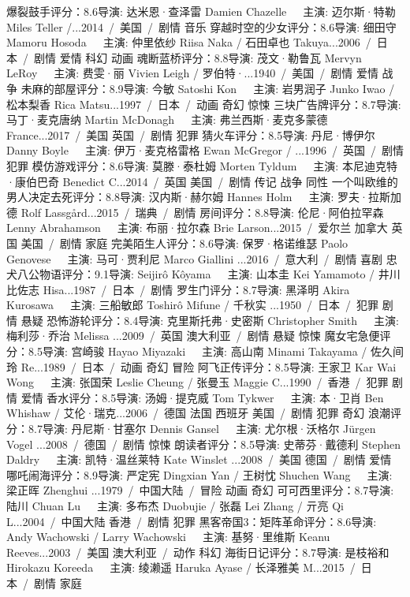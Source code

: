 爆裂鼓手评分：8.6导演: 达米恩·查泽雷 Damien Chazelle   主演: 迈尔斯·特勒 Miles Teller /...2014 / 美国 / 剧情 音乐
穿越时空的少女评分：8.6导演: 细田守 Mamoru Hosoda   主演: 仲里依纱 Riisa Naka / 石田卓也 Takuya...2006 / 日本 / 剧情 爱情 科幻 动画
魂断蓝桥评分：8.8导演: 茂文·勒鲁瓦 Mervyn LeRoy   主演: 费雯·丽 Vivien Leigh / 罗伯特·...1940 / 美国 / 剧情 爱情 战争
未麻的部屋评分：8.9导演: 今敏 Satoshi Kon   主演: 岩男润子 Junko Iwao / 松本梨香 Rica Matsu...1997 / 日本 / 动画 奇幻 惊悚
三块广告牌评分：8.7导演: 马丁·麦克唐纳 Martin McDonagh   主演: 弗兰西斯·麦克多蒙德 France...2017 / 美国 英国 / 剧情 犯罪
猜火车评分：8.5导演: 丹尼·博伊尔 Danny Boyle   主演: 伊万·麦克格雷格 Ewan McGregor / ...1996 / 英国 / 剧情 犯罪
模仿游戏评分：8.6导演: 莫滕·泰杜姆 Morten Tyldum   主演: 本尼迪克特·康伯巴奇 Benedict C...2014 / 英国 美国 / 剧情 传记 战争 同性
一个叫欧维的男人决定去死评分：8.8导演: 汉内斯·赫尔姆 Hannes Holm   主演: 罗夫·拉斯加德 Rolf Lassgård...2015 / 瑞典 / 剧情
房间评分：8.8导演: 伦尼·阿伯拉罕森 Lenny Abrahamson   主演: 布丽·拉尔森 Brie Larson...2015 / 爱尔兰 加拿大 英国 美国 / 剧情 家庭
完美陌生人评分：8.6导演: 保罗·格诺维瑟 Paolo Genovese   主演: 马可·贾利尼 Marco Giallini ...2016 / 意大利 / 剧情 喜剧
忠犬八公物语评分：9.1导演: Seijirô Kôyama   主演: 山本圭 Kei Yamamoto / 井川比佐志 Hisa...1987 / 日本 / 剧情
罗生门评分：8.7导演: 黑泽明 Akira Kurosawa   主演: 三船敏郎 Toshirô Mifune / 千秋实 ...1950 / 日本 / 犯罪 剧情 悬疑
恐怖游轮评分：8.4导演: 克里斯托弗·史密斯 Christopher Smith   主演: 梅利莎·乔治 Melissa ...2009 / 英国 澳大利亚 / 剧情 悬疑 惊悚
魔女宅急便评分：8.5导演: 宫崎骏 Hayao Miyazaki   主演: 高山南 Minami Takayama / 佐久间玲 Re...1989 / 日本 / 动画 奇幻 冒险
阿飞正传评分：8.5导演: 王家卫 Kar Wai Wong   主演: 张国荣 Leslie Cheung / 张曼玉 Maggie C...1990 / 香港 / 犯罪 剧情 爱情
香水评分：8.5导演: 汤姆·提克威 Tom Tykwer   主演: 本·卫肖 Ben Whishaw / 艾伦·瑞克...2006 / 德国 法国 西班牙 美国 / 剧情 犯罪 奇幻
浪潮评分：8.7导演: 丹尼斯·甘塞尔 Dennis Gansel   主演: 尤尔根·沃格尔 Jürgen Vogel ...2008 / 德国 / 剧情 惊悚
朗读者评分：8.5导演: 史蒂芬·戴德利 Stephen Daldry   主演: 凯特·温丝莱特 Kate Winslet ...2008 / 美国 德国 / 剧情 爱情
哪吒闹海评分：8.9导演: 严定宪 Dingxian Yan / 王树忱 Shuchen Wang   主演: 梁正晖 Zhenghui ...1979 / 中国大陆 / 冒险 动画 奇幻
可可西里评分：8.7导演: 陆川 Chuan Lu   主演: 多布杰 Duobujie / 张磊 Lei Zhang / 亓亮 Qi L...2004 / 中国大陆 香港 / 剧情 犯罪
黑客帝国3：矩阵革命评分：8.6导演: Andy Wachowski / Larry Wachowski   主演: 基努·里维斯 Keanu Reeves...2003 / 美国 澳大利亚 / 动作 科幻
海街日记评分：8.7导演: 是枝裕和 Hirokazu Koreeda   主演: 绫濑遥 Haruka Ayase / 长泽雅美 M...2015 / 日本 / 剧情 家庭

